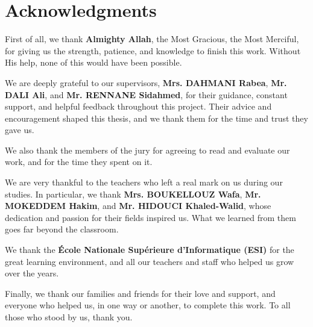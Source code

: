 \chapter*{Acknowledgments}

First of all, we thank \textbf{Almighty Allah}, the Most Gracious, the Most Merciful, for giving us the strength, patience, and knowledge to finish this work. Without His help, none of this would have been possible.

We are deeply grateful to our supervisors, \textbf{Mrs. DAHMANI Rabea}, \textbf{Mr. DALI Ali}, and \textbf{Mr. RENNANE Sidahmed}, for their guidance, constant support, and helpful feedback throughout this project. Their advice and encouragement shaped this thesis, and we thank them for the time and trust they gave us.

We also thank the members of the jury for agreeing to read and evaluate our work, and for the time they spent on it.

We are very thankful to the teachers who left a real mark on us during our studies. In particular, we thank \textbf{Mrs. BOUKELLOUZ Wafa}, \textbf{Mr. MOKEDDEM Hakim}, and \textbf{Mr. HIDOUCI Khaled-Walid}, whose dedication and passion for their fields inspired us. What we learned from them goes far beyond the classroom.

We thank the \textbf{\'{E}cole Nationale Sup\'{e}rieure d'Informatique (ESI)} for the great learning environment, and all our teachers and staff who helped us grow over the years.

Finally, we thank our families and friends for their love and support, and everyone who helped us, in one way or another, to complete this work. To all those who stood by us, thank you.